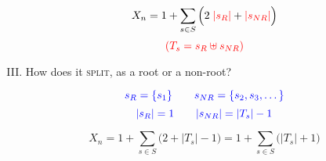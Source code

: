 
\begin{frame}{}
  \[
    X_{n} = 1 + \sum_{s \in S} \Big( 2\; \textcolor{red}{|s_{R}|} + \textcolor{red}{|s_{NR}|} \Big)
  \]
  \[
    \textcolor{red}{(T_{s} = s_{R} \uplus s_{NR})}
  \]

  \begin{enumerate}[(I)]
    \setcounter{enumi}{2}
    \centering
    \item How does it \textsc{split}, as a root or a non-root?
  \end{enumerate}

  \pause
  \[
    \textcolor{blue}{s_{R} = \{s_{1}\} \qquad s_{NR} = \{s_{2}, s_{3}, \dots\}}
  \]
  \[
    \textcolor{blue}{|s_{R}| = 1 \qquad |s_{NR}| = |T_{s}| - 1}
  \]

  \pause
  \[
    X_{n} = 1 + \sum_{s \in S} \Big(2 + |T_{s}| - 1\Big) = 1 + \sum_{s \in S} \Big( |T_{s}| + 1 \Big)
  \]
\end{frame}
